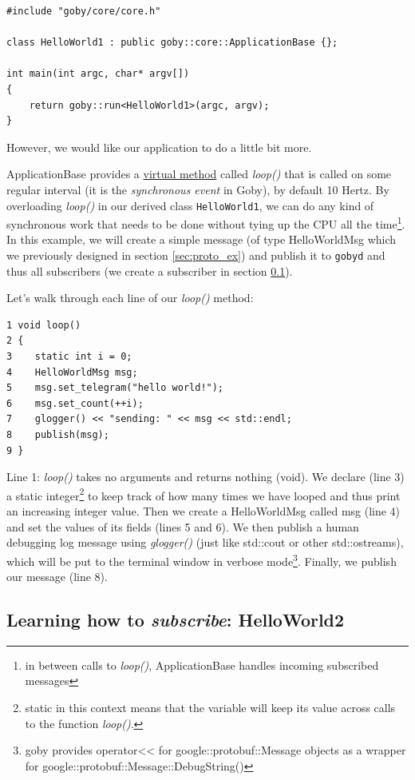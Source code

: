 \documentclass[11pt, letterpaper]{article}
\begin{document}
\begin{verbatim}
#include "goby/core/core.h"

class HelloWorld1 : public goby::core::ApplicationBase {};

int main(int argc, char* argv[])
{   
    return goby::run<HelloWorld1>(argc, argv);
}
\end{verbatim}

However, we would like our application to do a little bit more.

ApplicationBase provides a \href{http://www.cplusplus.com/doc/tutorial/polymorphism/}{virtual method} called \textit{loop()} that is called on some regular interval (it is the \textit{synchronous event} in Goby), by default 10 Hertz. By overloading \textit{loop()} in our derived class \texttt{HelloWorld1}, we can do any kind of synchronous work that needs to be done without tying up the CPU all the time\footnote{in between calls to \textit{loop()}, ApplicationBase handles incoming subscribed messages}. In this example, we will create a simple message (of type HelloWorldMsg which we previously designed in section \ref{sec:proto_ex}) and publish it to \texttt{gobyd} and thus all subscribers (we create a subscriber in section \ref{sec:sub_ex}). 

Let's walk through each line of our \textit{loop()} method:

\begin{verbatim}
1 void loop()
2 {
3    static int i = 0;
4    HelloWorldMsg msg;
5    msg.set_telegram("hello world!");
6    msg.set_count(++i);
7    glogger() << "sending: " << msg << std::endl;
8    publish(msg);
9 }
\end{verbatim}

Line 1: \textit{loop()} takes no arguments and returns nothing (void). We declare (line 3) a static integer\footnote{static in this context means that the variable will keep its value across calls to the function \textit{loop()}.} to keep track of how many times we have looped and thus print an increasing integer value. Then we create a HelloWorldMsg called msg (line 4) and set the values of its fields (lines 5 and 6). We then publish a human debugging log message using \textit{glogger()} (just like std::cout or other std::ostreams), which will be put to the terminal window in verbose mode\footnote{goby provides operator<< for google::protobuf::Message objects as a wrapper for google::protobuf::Message::DebugString()}. Finally, we publish our message (line 8).

\subsection{Learning how to \textit{subscribe}: HelloWorld2} \label{sec:sub_ex}
\end{document}
